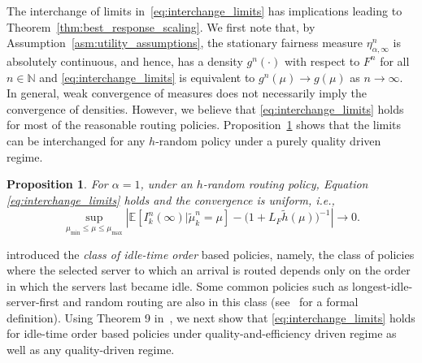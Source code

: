 \documentclass[a4paper,11pt,twoside]{article}
\numberwithin{equation}{section}
\numberwithin{figure}{section}
\theoremstyle{plain}
\newtheorem{proposition}[theorem]{Proposition}
\newcommand{\EE}{\mathbb{E}}
\newcommand{\NN}{\mathbb{N}}
\newcommand{\1}{\mathbbm{1}}
\begin{document}

The interchange of limits in~\eqref{eq:interchange_limits} has implications leading to Theorem~\ref{thm:best_response_scaling}. We first note that,  by Assumption~\ref{asm:utility_assumptions}, the stationary fairness measure $\eta_{\alpha,\infty}^n$ is absolutely continuous, and hence, has a density $g^n(\cdot)$  with respect to $F^n$ for all $n\in \NN$ and \eqref{eq:interchange_limits} is equivalent to $g^n(\mu)\to g(\mu)$ as $n\to \infty$. In general, weak convergence of measures does not necessarily imply the convergence of densities. However, we believe that \eqref{eq:interchange_limits} holds for most of the reasonable routing policies. 
Proposition~\ref{thm:interchange_generalized_rr} shows that the limits can be interchanged for any $h$-random policy under a purely quality driven regime. 
\begin{proposition}\label{thm:interchange_generalized_rr}
For $\alpha=1$, under an $h$-random routing policy, Equation \eqref{eq:interchange_limits} holds and the convergence is uniform, i.e., \begin{equation}\sup_{\mu_{\min}\leq \mu\leq\mu_{\max}}\left|\EE[I_k^n(\infty)|\tilde{\mu}_k^n=\mu]- \big( 1+L_F\tilde{h}(\mu) \big)^{-1}\right|\to 0.\label{eq:h_random_individual}
\end{equation}
\end{proposition}


\cite{Gopalakrishnan_etal2016} introduced the \textit{class of idle-time order} based policies, namely, the class of policies where the selected server to which an arrival is routed depends only on the order in which the servers last became idle. 
Some common policies such as longest-idle-server-first and random routing are also in this class (see~\cite{Gopalakrishnan_etal2016} for a formal definition). Using Theorem 9 in~\cite{Gopalakrishnan_etal2016}, we next show that \eqref{eq:interchange_limits} holds for idle-time order based policies under quality-and-efficiency driven regime as well as any quality-driven regime. 
\end{document}
